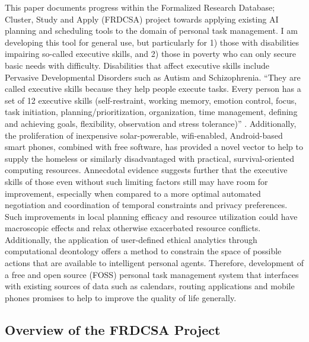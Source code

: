 \documentclass[letterpaper]{article}
\begin{document}
This paper documents progress within the Formalized Research Database;
Cluster, Study and Apply (FRDCSA) project towards applying existing AI
planning and scheduling tools to the domain of personal task
management.  I am developing this tool for general use, but
particularly for 1) those with disabilities impairing so-called
executive skills, and 2) those in poverty who can only secure basic
needs with difficulty.  Disabilities that affect executive skills
include Pervasive Developmental Disorders such as Autism and
Schizophrenia.  ``They are called executive skills because they help
people execute tasks.  Every person has a set of 12 executive skills
(self-restraint, working memory, emotion control, focus, task
initiation, planning/prioritization, organization, time management,
defining and achieving goals, flexibility, observation and stress
tolerance)'' \cite{cio2006}.  Additionally, the proliferation of
inexpensive solar-powerable, wifi-enabled, Android-based smart phones,
combined with free software, has provided a novel vector to help to
supply the homeless or similarly disadvantaged with practical,
survival-oriented computing resources.  Annecdotal evidence suggests
further that the executive skills of those even without such limiting
factors still may have room for improvement, especially when compared
to a more optimal automated negotiation and coordination of temporal
constraints and privacy preferences.  Such improvements in local
planning efficacy and resource utilization could have macroscopic
effects and relax otherwise exacerbated resource conflicts.
Additionally, the application of user-defined ethical analytics
through computational deontology offers a method to constrain the
space of possible actions that are available to intelligent personal
agents.  Therefore, development of a free and open source (FOSS)
personal task management system that interfaces with existing sources
of data such as calendars, routing applications and mobile phones
promises to help to improve the quality of life generally.

\subsection{Overview of the FRDCSA Project}
\end{document}

